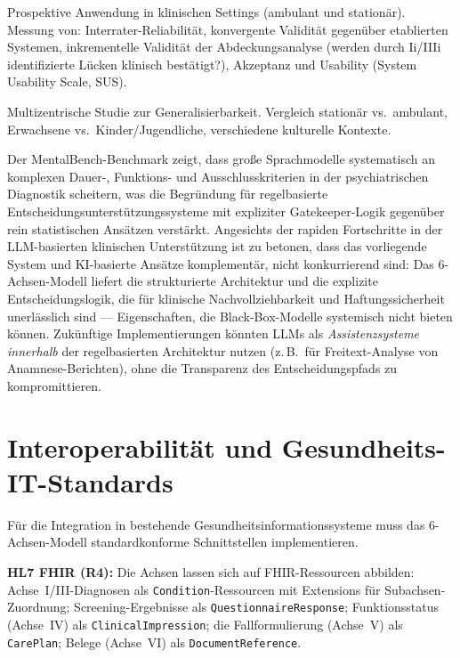 \documentclass[11pt,a4paper]{article}
\begin{document}
\begin{description}[style=nextline, leftmargin=1.5cm, font=\bfseries]
\item[Phase~3: Klinische Felderprobung (N=200+)] Prospektive Anwendung in klinischen Settings (ambulant und station\"ar). Messung von: Interrater-Reliabilit\"at, konvergente Validit\"at gegen\"uber etablierten Systemen, inkrementelle Validit\"at der Abdeckungsanalyse (werden durch Ii/IIIi identifizierte L\"ucken klinisch best\"atigt?), Akzeptanz und Usability (System Usability Scale, SUS).
\item[Phase~4: Multi-Site-Trial] Multizentrische Studie zur Generalisierbarkeit. Vergleich station\"ar vs.\ ambulant, Erwachsene vs.\ Kinder/Jugendliche, verschiedene kulturelle Kontexte.
\end{description}

Der MentalBench-Benchmark \citep{Song2026MentalBench} zeigt, dass gro\ss{}e Sprachmodelle systematisch an komplexen Dauer-, Funktions- und Ausschlusskriterien in der psychiatrischen Diagnostik scheitern, was die Begr\"undung f\"ur regelbasierte Entscheidungsunterst\"utzungssysteme mit expliziter Gatekeeper-Logik gegen\"uber rein statistischen Ans\"atzen verst\"arkt. Angesichts der rapiden Fortschritte in der LLM-basierten klinischen Unterst\"utzung ist zu betonen, dass das vorliegende System und KI-basierte Ans\"atze komplement\"ar, nicht konkurrierend sind: Das 6-Achsen-Modell liefert die strukturierte Architektur und die explizite Entscheidungslogik, die f\"ur klinische Nachvollziehbarkeit und Haftungssicherheit unerl\"asslich sind --- Eigenschaften, die Black-Box-Modelle systemisch nicht bieten k\"onnen. Zuk\"unftige Implementierungen k\"onnten LLMs als \textit{Assistenzsysteme innerhalb} der regelbasierten Architektur nutzen (z.\,B.\ f\"ur Freitext-Analyse von Anamnese-Berichten), ohne die Transparenz des Entscheidungspfads zu kompromittieren.


\section{Interoperabilit\"at und Gesundheits-IT-Standards}
\label{sec:interop}

F\"ur die Integration in bestehende Gesundheitsinformationssysteme muss das 6-Achsen-Modell standardkonforme Schnittstellen implementieren.

\textbf{HL7 FHIR (R4):} Die Achsen lassen sich auf FHIR-Ressourcen abbilden: Achse~I/III-Diagnosen als \texttt{Condition}-Ressourcen mit Extensions f\"ur Subachsen-Zuordnung; Screening-Ergebnisse als \texttt{QuestionnaireResponse}; Funktionsstatus (Achse~IV) als \texttt{ClinicalImpression}; die Fallformulierung (Achse~V) als \texttt{CarePlan}; Belege (Achse~VI) als \texttt{DocumentReference}.
\end{document}
